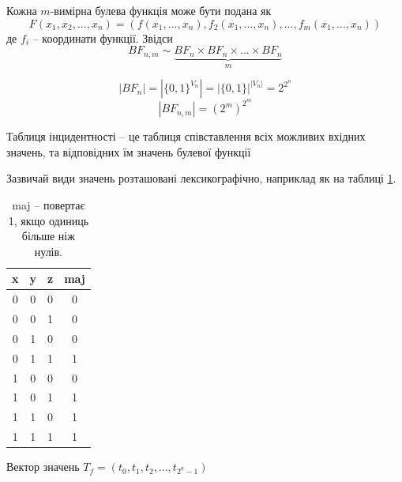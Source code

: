 \begin{remark}
    Кожна $m$-вимірна булева функція може бути подана як
    \begin{equation*}
        F(x_1, x_2, ..., x_n) = (f(x_1, ..., x_n), f_2(x_1, ..., x_n), ..., f_m(x_1, ..., x_n))
    \end{equation*}
    де $f_i$ -- координати функції. Звідси
    \begin{equation*}    
        BF_{n, m} \sim \underbrace{BF_n \times BF_n \times ... \times BF_n}_{m}
    \end{equation*}
\end{remark}


\begin{lemma}
    \begin{equation*}
        |BF_n| = |\{0, 1\}^{V_n}| = |\{0, 1\}|^{|V_n|} = 2^{2^n}
    \end{equation*}
    \begin{equation*}
        |BF_{n, m}| = (2^m)^{2^m}
    \end{equation*}
\end{lemma}

\begin{definition}
Таблиця інцидентності -- це таблиця співставлення всіх
можливих вхідних значень, та відповідних їм значень булевої
функції
\end{definition}

Зазвичай види значень розташовані лексикографічно, наприклад як на таблиці \ref{tab:discrette_math:maj_example}.

\begin{table}[ht]
    \centering
    \begin{tabular}{ccc|c}
        x&y&z&maj \\
        \hline
        0&0&0&0 \\
        0&0&1&0 \\
        0&1&0&0 \\
        0&1&1&1 \\
        1&0&0&0 \\
        1&0&1&1 \\
        1&1&0&1 \\
        1&1&1&1 \\
    \end{tabular}
    \caption{maj -- повертає 1, якщо одиниць більше ніж нулів.}
    \label{tab:discrette_math:maj_example}
\end{table}

Вектор значень $T_f = (t_0, t_1, t_2, ..., t_{2^n - 1})$

